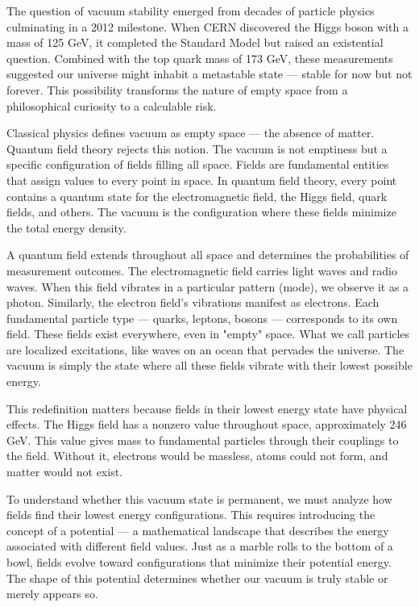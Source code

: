 
The question of vacuum stability emerged from decades of particle physics culminating in a 2012 milestone. When CERN discovered the Higgs boson with a mass of 125 GeV, it completed the Standard Model but raised an existential question. Combined with the top quark mass of 173 GeV, these measurements suggested our universe might inhabit a metastable state — stable for now but not forever. This possibility transforms the nature of empty space from a philosophical curiosity to a calculable risk.

Classical physics defines vacuum as empty space — the absence of matter. Quantum field theory rejects this notion. The vacuum is not emptiness but a specific configuration of fields filling all space. Fields are fundamental entities that assign values to every point in space. In quantum field theory, every point contains a quantum state for the electromagnetic field, the Higgs field, quark fields, and others. The vacuum is the configuration where these fields minimize the total energy density.

A quantum field extends throughout all space and determines the probabilities of measurement outcomes. The electromagnetic field carries light waves and radio waves. When this field vibrates in a particular pattern (mode), we observe it as a photon. Similarly, the electron field's vibrations manifest as electrons. Each fundamental particle type — quarks, leptons, bosons — corresponds to its own field. These fields exist everywhere, even in "empty" space. What we call particles are localized excitations, like waves on an ocean that pervades the universe. The vacuum is simply the state where all these fields vibrate with their lowest possible energy.

This redefinition matters because fields in their lowest energy state have physical effects. The Higgs field has a nonzero value throughout space, approximately 246 GeV. This value gives mass to fundamental particles through their couplings to the field. Without it, electrons would be massless, atoms could not form, and matter would not exist.

To understand whether this vacuum state is permanent, we must analyze how fields find their lowest energy configurations. This requires introducing the concept of a potential — a mathematical landscape that describes the energy associated with different field values. Just as a marble rolls to the bottom of a bowl, fields evolve toward configurations that minimize their potential energy. The shape of this potential determines whether our vacuum is truly stable or merely appears so.

